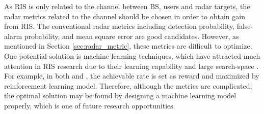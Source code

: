 As RIS is only related to the channel between BS, users and radar targets, the radar metrics related to the channel should be chosen 
in order to obtain gain from RIS. The conventional radar metrics including detection probability, false-alarm probability, and mean square error 
are good candidates. However, as mentioned in Section \ref{sec:radar_metric}, these metrics are difficult to optimize. One potential 
solution is machine learning techniques, which have attracted much attention in RIS research due to their learning capability and large
search-space \cite{liu2020RIS}. For example, in both \cite{huang2020reconfigurable} and \cite{taha2020deep}, the achievable rate 
is set as reward and maximized by reinforcement learning model. Therefore, although the metrics are complicated, the optimal solution 
may be found by designing a machine learning model properly, which is one of future research opportunities.
